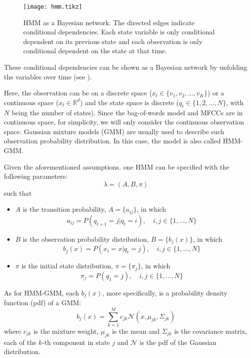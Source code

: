 \documentclass[12pt,final,twoside]{report}
\begin{document}
\begin{figure}[t]
  \centering
  \texttt{[image: hmm.tikz]}
  \caption[HMM as a Bayesian network.]{HMM as a Bayesian network. The directed edges indicate conditional dependencies. Each state variable is only conditional dependent on its previous state and each observation is only conditional dependent on the state at that time.}
  \label{fig:hmm}
\end{figure}

These conditional dependencies can be shown as a Bayesian network by unfolding the variables over time (see ).

Here, the observation can be on a discrete space ($x_t \in \{v_1, v_2, \dots, v_K\}$) or a continuous space ($x_t \in \mathbb{R}^d$) and the state space is discrete ($q_t \in \{1, 2, \dots, N\}$, with $N$ being the number of states). Since the bag-of-words model and MFCCs are in continuous space, for simplicity, we will only consider the continuous observation space. Gaussian mixture models (GMM) are usually used to describe such observation probability distribution. In this case, the model is also called HMM-GMM.

Given the aforementioned assumptions, one HMM can be specified with the following parameters:
\[ \lambda = (A, B, \pi) \]
such that
\begin{itemize}
  \item $A$ is the transition probability, $A = \{a_{ij}\}$, in which 
    \[ a_{ij} = P(q_{t+1} = j | q_t = i), \quad i,j \in \{1, \dots, N\} \]
  \item $B$ is the observation probability distribution, $B = \{b_j(x)\}$, in which
    \[ b_j(x) = P(x_t = x | q_t = j), \quad i,j \in \{1, \dots, N\} \]
  \item $\pi$ is the initial state distribution, $\pi = \{\pi_j\}$, in which
    \[ \pi_j = P(q_1 = j), \quad i,j \in \{1, \dots, N\} \]
\end{itemize}

As for HMM-GMM, each $b_j(x)$, more specifically, is a probability density function (pdf) of a GMM:
\[ b_j(x) = \sum_{k=1}^M c_{jk} \mathcal{N}(x, \mu_{jk}, \Sigma_{jk}) \]
where $c_{jk}$ is the mixture weight, $\mu_{jk}$ is the mean and $\Sigma_{jk}$ is the covariance matrix, each of the $k$-th component in state $j$ and $\mathcal{N}$ is the pdf of the Gaussian distribution. 
\end{document}

